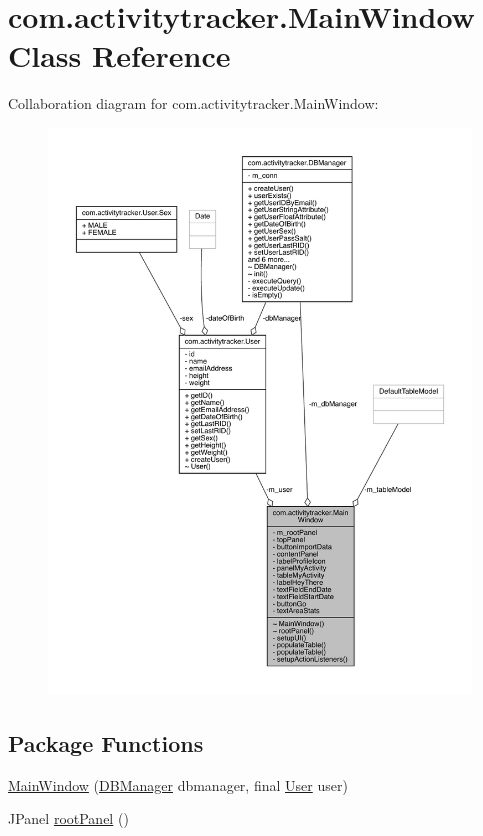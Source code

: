 \hypertarget{classcom_1_1activitytracker_1_1_main_window}{}\section{com.\+activitytracker.\+Main\+Window Class Reference}
\label{classcom_1_1activitytracker_1_1_main_window}


Collaboration diagram for com.\+activitytracker.\+Main\+Window\+:
\nopagebreak
\begin{figure}[H]
\begin{center}
\leavevmode
\includegraphics[width=350pt]{classcom_1_1activitytracker_1_1_main_window__coll__graph}
\end{center}
\end{figure}
\subsection*{Package Functions}
\begin{DoxyCompactItemize}
\item 
\mbox{\hyperlink{classcom_1_1activitytracker_1_1_main_window_ad89306d2683db39f9d17c7b06d814bed}{Main\+Window}} (\mbox{\hyperlink{classcom_1_1activitytracker_1_1_d_b_manager}{D\+B\+Manager}} dbmanager, final \mbox{\hyperlink{classcom_1_1activitytracker_1_1_user}{User}} user)
\item 
J\+Panel \mbox{\hyperlink{classcom_1_1activitytracker_1_1_main_window_a62e9c6f477ccc5b93aff33abb567fde4}{root\+Panel}} ()
\end{DoxyCompactItemize}
